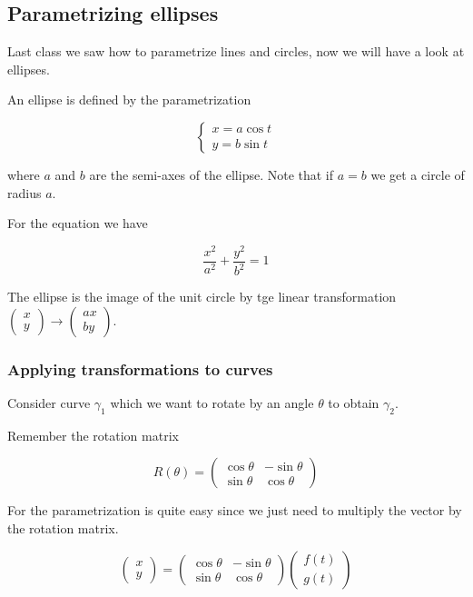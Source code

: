 \documentclass[10pt]{extarticle}
\begin{document}
\subsection{Parametrizing ellipses}

Last class we saw how to parametrize lines and circles, now we will have a look at ellipses.

An ellipse is defined by the parametrization

\[
    \begin{cases}
        x = a \cos t \\
        y = b \sin t
    \end{cases}
\]

where $a$ and $b$ are the semi-axes of the ellipse. Note that if $a = b$ we get a circle of radius $a$.

For the equation we have

$$
    \frac{x^2}{a^2} + \frac{y^2}{b^2} = 1
$$

The ellipse is the image of the unit circle by tge linear transformation $\begin{pmatrix}
        x \\ y
    \end{pmatrix} \to \begin{pmatrix}
        ax \\ by
    \end{pmatrix}$.

\subsubsection{Applying transformations to curves}

Consider curve $\gamma_1$ which we want to rotate by an angle $\theta$ to obtain $\gamma_2$.

Remember the rotation matrix

$$
    R(\theta) = \begin{pmatrix}
        \cos \theta & -\sin \theta \\
        \sin \theta & \cos \theta
    \end{pmatrix}
$$

For the parametrization is quite easy since we just need to multiply the vector by the rotation matrix.

$$
    \begin{pmatrix}
        x \\ y
    \end{pmatrix} = \begin{pmatrix}
        \cos \theta & -\sin \theta \\
        \sin \theta & \cos \theta
    \end{pmatrix} \begin{pmatrix}
        f(t) \\ g(t)
    \end{pmatrix}
$$
\end{document}
